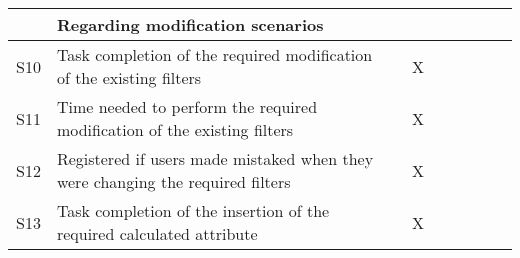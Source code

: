 \begin{longtable}{@{}lm{7cm}ccccccc@{}}
                & \textbf{Regarding modification scenarios}                                                                                                               &                                                &                                                &                                                &                                                &                                                &                                                &                                                \\* \midrule
    S10         & Task completion of the required modification of the existing filters                                                                                    &                                                & X                                              &                                                &                                                &                                                &                                                &                                                \\
    S11         & Time needed to perform the required modification of the existing filters                                                                                &                                                & X                                              &                                                &                                                &                                                &                                                &                                                \\
    S12         & Registered if users made mistaked when they were changing the required filters                                                                          &                                                & X                                              &                                                &                                                &                                                &                                                &                                                \\
    S13         & Task completion of the insertion of the required calculated attribute                                                                                   &                                                & X                                              &                                                &                                                &                                                &                                                &                                                \\

\end{longtable}

